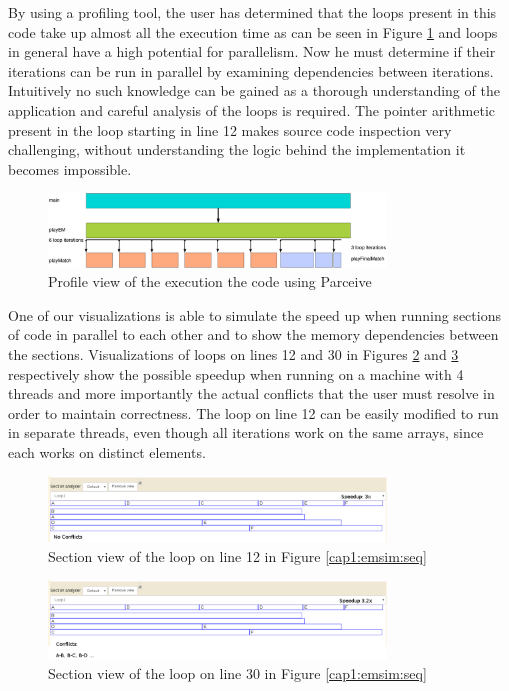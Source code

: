 By using a profiling tool, the user has determined that the loops present in this code take up almost all the execution time as can be seen in Figure \ref{cap1:emsim:profile} and loops in general have a high potential for parallelism. Now he must determine if their iterations can be run in parallel by examining dependencies between iterations. Intuitively no such knowledge can be gained as a thorough understanding of the application and careful analysis of the loops is required. The pointer arithmetic present in the loop starting in line 12 makes source code inspection very challenging, without understanding the logic behind the implementation it becomes impossible.

\begin{figure}[!ht]
	\centering
	\includegraphics[width=0.8\textwidth]{emsimprofile}
	\caption{Profile view of the execution the code using Parceive}
	\label{cap1:emsim:profile}
\end{figure}

One of our visualizations is able to simulate the speed up when running sections of code in parallel to each other and to show the memory dependencies between the sections. Visualizations of loops on lines 12 and 30 in Figures \ref{cap1:emsim:sections1} and \ref{cap1:emsim:sections2} respectively show the possible speedup when running on a machine with 4 threads and more importantly the actual conflicts that the user must resolve in order to maintain correctness. The loop on line 12 can be easily modified to run in separate threads, even though all iterations work on the same arrays, since each works on distinct elements.

\begin{figure}[!ht]
	\centering
	\includegraphics[width=0.8\textwidth]{loop1section}
	\caption{Section view of the loop on line 12 in Figure \ref{cap1:emsim:seq}}
	\label{cap1:emsim:sections1}
\end{figure}

\begin{figure}[!ht]
	\centering
	\includegraphics[width=0.8\textwidth]{loop2section}
	\caption{Section view of the loop on line 30 in Figure \ref{cap1:emsim:seq}}
	\label{cap1:emsim:sections2}
\end{figure}

